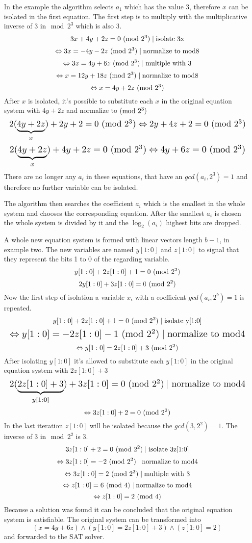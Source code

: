In the example the algorithm selects $a_1$ which has the value $3$, therefore $x$ can be isolated in the first equation.
The first step is to multiply with the multiplicative inverse of 3 in$\mod{2^3}$ which is also 3.
$$3x+4y+2z = 0 \ (\mathrm{mod}\ 2^3) \mid \text{isolate 3x}$$
$$\Leftrightarrow 3x=-4y-2z  \ (\mathrm{mod}\ 2^3)  \mid \text{normalize to mod8}$$
$$\Leftrightarrow 3x=4y+6z  \ (\mathrm{mod}\ 2^3)  \mid \text{multiple with 3}$$
$$\Leftrightarrow x=12y+18z \ (\mathrm{mod}\ 2^3)  \mid \text{normalize to mod8}$$
$$\Leftrightarrow x=4y+2z \ (\mathrm{mod}\ 2^3)$$
After $x$ is isolated, it's possible to substitute each $x$ in the original equation system with $4y+2z$ and normalize to$\ (\mathrm{mod}\ 2^3)$
\[\resizebox{\columnwidth}{!}{$\displaystyle
$$2(\underbrace{4y+2z}_{x})+2y+2=0 \Mod{2^3} \Leftrightarrow 2y + 4z + 2 = 0\Mod{2^3} $$
$}\]
\[\resizebox{\columnwidth}{!}{$\displaystyle
$$2(\underbrace{4y+2z}_{x})+ 4y + 2z = 0 \Mod{2^3} \Leftrightarrow 4y + 6z = 0\Mod{2^3} $$
$}\]
There are no longer any ${a_i}$ in these equations, that have an $gcd(a_i,2^3) = 1$ and therefore no further variable can be isolated.

The algorithm then searches the coefficient $a_i$ which is the smallest in the whole system and chooses the corresponding equation.
After the smallest $a_i$ is chosen the whole system is divided by it and the $\log_{2}(a_i)$ highest bits are dropped.

A whole new equation system is formed with linear vectors length $b-1$, in example two.
The new variables are named $y[1:0]$ and $z[1:0]$ to signal that they represent the bits 1 to 0 of the regarding variable.
$$y[1 : 0] + 2z[1 : 0] + 1 = 0 \ (\mathrm{mod}\ 2^2)$$
$$2y[1 : 0] + 3z[1 : 0] = 0\ (\mathrm{mod}\ 2^2)$$
Now the first step of isolation a variable $x_i$ with a coefficient $gcd(a_i, 2^b)=1$ is repeated.
$$y[1 : 0] + 2z[1 : 0] + 1 = 0 \ (\mathrm{mod}\ 2^2)\mid \text{isolate y[1:0]}$$
\[\resizebox{\columnwidth}{!}{$\displaystyle
$$\Leftrightarrow y[1 : 0] = -2z[1 : 0] -1 \Mod{2^2} \mid \text{normalize to mod4}$$
$}\]
$$\Leftrightarrow y[1 : 0] = 2z[1 : 0] +3 \ (\mathrm{mod}\ 2^2)$$
After isolating $y[1 : 0] $ it's allowed to substitute each $y[1 : 0] $ in the original equation system with $2z[1:0]+3$
\[\resizebox{\columnwidth}{!}{$\displaystyle
$$2(\underbrace{2z[1:0]+3}_{y[1:0]}) + 3z[1 : 0] = 0\Mod{2^2} \mid \text{normalize to mod4}$$
$}\]
$$\Leftrightarrow 3z[1:0] + 2 = 0 \ (\mathrm{mod}\ 2^2)$$
In the last iteration $z[1:0]$ will be isolated because the $gcd(3,2^2) = 1$. The inverse of 3 in$\mod{2^2}$ is 3.
$$3z[1:0] + 2 = 0 \ (\mathrm{mod}\ 2^2) \mid \text{isolate 3z[1:0]}$$
$$\Leftrightarrow 3z[1:0]=-2  \ (\mathrm{mod}\ 2^2)   \mid \text{normalize to mod4}$$
$$\Leftrightarrow 3z[1:0]=2  \ (\mathrm{mod}\ 2^2)   \mid \text{multiple with 3}$$
$$\Leftrightarrow z[1:0]=6  \ (\mathrm{mod}\ 4)  \mid \text{normalize to mod4}$$
$$\Leftrightarrow z[1:0]=2  \ (\mathrm{mod}\ 4)$$
Because a solution was found it can be concluded that the original equation system is satisfiable.
The original system can be transformed into $$(x = 4y + 6z) \land (y[1 : 0] = 2z[1 : 0] + 3) \land (z[1 : 0] = 2)$$ and forwarded to the SAT solver.
